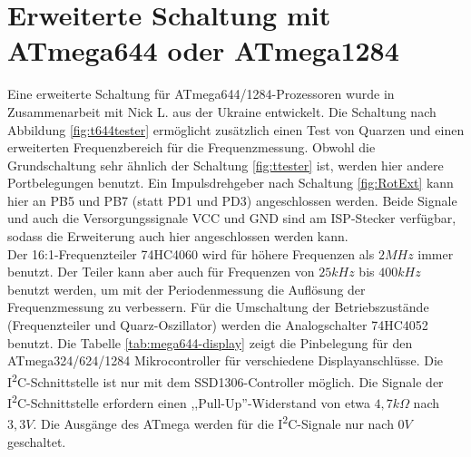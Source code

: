 \section{Erweiterte Schaltung mit ATmega644 oder ATmega1284}

Eine erweiterte Schaltung für ATmega644/1284-Prozessoren wurde in Zusammenarbeit mit Nick L. aus
der Ukraine entwickelt. Die Schaltung nach Abbildung \ref{fig:t644tester} ermöglicht zusätzlich
einen Test von Quarzen und einen erweiterten Frequenzbereich für die Frequenzmessung.
Obwohl die Grundschaltung sehr ähnlich der Schaltung \ref{fig:ttester} ist, werden hier
andere Portbelegungen benutzt.
Ein Impulsdrehgeber nach Schaltung \ref{fig:RotExt} kann hier an PB5 und PB7 (statt PD1 und PD3) angeschlossen werden.
Beide Signale und auch die Versorgungssignale VCC und GND sind am ISP-Stecker verfügbar,
sodass die Erweiterung auch hier angeschlossen werden kann.\\

Der 16:1-Frequenzteiler 74HC4060 wird für höhere Frequenzen als \(2MHz\) immer benutzt.
Der Teiler kann aber auch für Frequenzen von \(25kHz\) bis \(400kHz\) benutzt werden, um mit der
Periodenmessung die Auflösung der Frequenzmessung zu verbessern.
Für die Umschaltung der Betriebszustände (Frequenzteiler und Quarz-Oszillator) werden
die Analogschalter 74HC4052 benutzt.
Die Tabelle \ref{tab:mega644-display} zeigt die Pinbelegung für den ATmega324/624/1284 Mikrocontroller für verschiedene Displayanschlüsse.
Die I\textsuperscript{2}C-Schnittstelle ist nur mit dem SSD1306-Controller möglich.
Die Signale der I\textsuperscript{2}C-Schnittstelle erfordern einen ,,Pull-Up''-Widerstand von etwa \(4,7k\Omega\) nach \(3,3V\).
Die Ausgänge des ATmega werden für die I\textsuperscript{2}C-Signale nur nach \(0V\) geschaltet.


